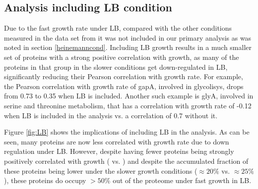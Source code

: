 \subsection{Analysis including LB condition}
\label{lbanalysis}
Due to the fast growth rate under LB, compared with the other conditions measured in the data set from \cite{Heinemann2015} it was not included in our primary analysis as was noted in section \ref{heinemanncond}.
Including LB growth results in a much smaller set of proteins with a strong positive correlation with growth, as many of the proteins in that group in the slower conditions get down-regulated in LB, significantly reducing their Pearson correlation with growth rate.
For example, the Pearson correlation with growth rate of gapA, involved in glycolisys, drops from 0.73 to 0.35 when LB is included.
Another such example is glyA, involved in serine and threonine metabolism, that has a correlation with
growth rate of -0.12 when LB is included in the analysis vs. a correlation of 0.7 without it.

Figure \ref{fig:LB} shows the implications of including LB in the analysis.
As can be seen, many proteins are now less correlated with growth rate due to down regulation under LB.
However, despite having fewer proteins being strongly positively correlated with growth (\hGlobalLB{} vs. \hGlobal{}) and despite the accumulated fraction of these proteins being lower under the slower growth conditions ($\approx20\%$ vs. $\approx25\%$), these proteins do occupy $>50\%$ out of the proteome under fast growth in LB.